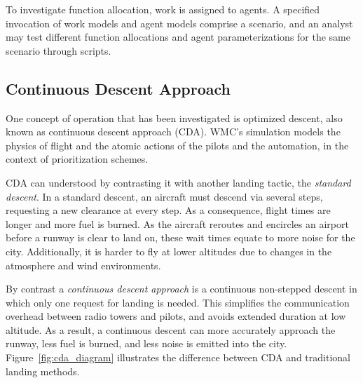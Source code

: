 \documentclass[journal]{IEEEtran}
\newcommand{\fig}[1]{Figure~\ref{fig:#1}}
\begin{document}
To investigate function allocation, work is assigned to agents. A specified invocation of work models and agent models comprise a scenario, and an analyst may test different function allocations and agent parameterizations for the same scenario through scripts.

\subsection{Continuous Descent Approach}

One concept of operation that has been investigated is optimized descent, also known as continuous descent approach (CDA).
WMC's  simulation models the physics of flight and the atomic actions of the pilots and the automation, in the context of prioritization schemes.


CDA can understood by contrasting it with another landing tactic, the {\em standard descent}.  
In a standard descent, an aircraft must descend via several steps, requesting a new clearance at every step.  
As a consequence, flight times are longer and more fuel is burned.  
As the aircraft reroutes and encircles an airport before a runway is clear to land on, these wait times equate to more noise for the city.
Additionally, it is harder to fly at lower altitudes due to changes in the atmosphere and wind environments.

By contrast a {\em continuous descent approach} is a continuous non-stepped descent in which only one request for landing is needed.  
This simplifies the communication overhead between radio towers and pilots, and avoids extended duration at low altitude.  
As a result, a continuous descent can more accurately approach the runway, less fuel is burned, and less noise is emitted into the city.  
\fig{cda_diagram} illustrates the difference between CDA and traditional landing methods.

 



 
\end{document}
